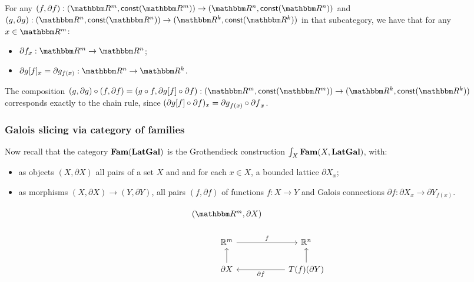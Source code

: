 For any $(f, \partial f): (\RR^m, \const(\RR^m)) \to (\RR^n, \const(\RR^n))$ and $(g, \partial g): (\RR^n,
\const(\RR^n)) \to (\RR^k, \const(\RR^k))$ in that subcategory, we have that for any $x \in \RR^m$:
\begin{itemize}
\item $\partial f_x: \RR^m \to \RR^n$;
\item $\reindex{\partial g}{f}_x = \partial g_{f(x)}: \RR^n \to \RR^k$.
\end{itemize}

\noindent The composition $(g, \partial g) \comp (f, \partial f) = (g \comp f, \reindex{\partial g}{f} \comp
\partial f): (\RR^m, \const(\RR^m)) \to (\RR^k, \const(\RR^k))$ corresponds exactly to the chain rule, since
$(\partial g[f] \circ \partial f)_x = {\partial g}_{f(x)} \circ {\partial f}_x$.

\subsubsection{Galois slicing via category of families}

Now recall that the category $\mathbf{Fam}(\mathbf{LatGal})$ is the Grothendieck construction $\int_{X}\mathbf{Fam}(X,
\mathbf{LatGal})$, with:
\begin{itemize}
\item as objects $(X, \partial X)$ all pairs of a set $X$ and and for each $x \in X$, a bounded lattice
$\partial X_x$;
\item as morphisms $(X, \partial X) \to (Y, \partial Y)$, all pairs $(f, \partial f)$ of functions $f: X \to
Y$ and Galois connections $\partial f: \partial X_x \to \partial Y_{f(x)}$.
\end{itemize}

\[
\begin{tikzcd}
(\RR^m, \partial X) \\ %
\mathbb{R}^m \arrow[r, "f"] & \mathbb{R}^n \\
\partial X \arrow[u] & T(f)(\partial Y) \arrow[l, "\partial f"] \arrow[u]
\end{tikzcd}
\]
